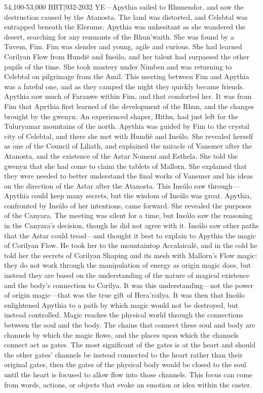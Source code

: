 \documentclass[smalldemyvopaper,11pt,twoside,onecolumn,openright,extrafontsizes]{memoir}
\begin{document}
{{54,100-53,000 BBT|932-2032 YE—Apythia sailed to Rhunendor, and saw the destruction caused by the Atanosta. The land was distorted, and Celebtal was entrapped beneath the Elerume. Apythia was unhesitant as she wandered the desert, searching for any remnants of the Rhun’waith. She was found by a Tuvem, Fim. Fim was slender and young, agile and curious. She had learned Corilyan Flow from Hundië and Insúlo, and her talent had surpassed the other pupils of the time. She took mastery under Nimben and was returning to Celebtal on pilgrimage from the Amil.
This meeting between Fim and Apythia was a fateful one, and as they camped the night they quickly became friends. Apythia saw much of Faranwe within Fim, and that comforted her. It was from Fim that Apythia first learned of the development of the Rhun, and the changes brought by the gwenyn. An experienced shaper, Hithu, had just left for the Tuluryamar mountains of the north. Apythia was guided by Fim to the crystal city of Celebtal, and there she met with Hundië and Insúlo. She revealed herself as one of the Council of Liliath, and explained the miracle of Vanemer after the Atanosta, and the existence of the Astar Nomeni and Esthela. She told the gwenyn that she had come to claim the tablets of Mallorn. She explained that they were needed to better understand the final works of Vanemer and his ideas on the direction of the Astar after the Atanosta. This Insúlo saw through—Apythia could keep many secrets, but the wisdom of Insúlo was great. Apythia, confronted by Insúlo of her intentions, came forward. She revealed the purposes of the Canyara. The meeting was silent for a time, but Insúlo saw the reasoning in the Canyara’s decision, though he did not agree with it. Insúlo saw other paths that the Astar could tread—and thought it best to explain to Apythia the magic of Corilyan Flow. He took her to the mountaintop Accalaicalë, and in the cold he told her the secrets of Corilyan Shaping and its mesh with Mallorn’s Flow magic: they do not work through the manipulation of energy as origin magic does, but instead they are based on the understanding of the nature of magical existence and the body’s connection to Corilya. It was this understanding—not the power of origin magic—that was the true gift of Hera’roilya.
It was then that Insúlo enlightened Apythia to a path by which magic would not be destroyed, but instead controlled. Magic reaches the physical world through the connections between the soul and the body. The chains that connect these soul and body are channels by which the magic flows, and the places upon which the channels connect act as gates. The most significant of the gates is at the heart and should the other gates’ channels be instead connected to the heart rather than their original gates, then the gates of the physical body would be closed to the soul until the heart is focused to allow flow into those channels. This focus can come from words, actions, or objects that evoke an emotion or idea within the caster.
}}
\end{document}
